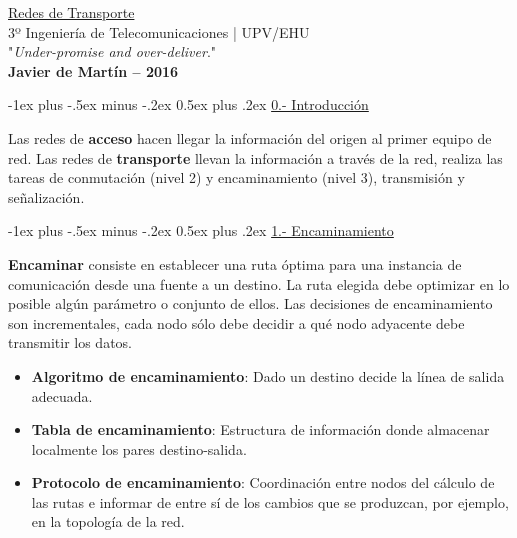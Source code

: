\documentclass[10pt,portrait, twocolumn]{article}
\makeatletter
\renewcommand{\section}{\@startsection{section}{1}{0mm}%
                                {-1ex plus -.5ex minus -.2ex}%
                                {0.5ex plus .2ex}%
                                {\normalfont\large\bfseries}}
\makeatother
\begin{document}
\begin{framed}
	\begin{center}
    	\Large{\underline{Redes de Transporte}} \\
    	\scriptsize{3º Ingeniería de Telecomunicaciones | UPV/EHU}\\
     	"\textsl{Under-promise and over-deliver}." \\
     	\small{\textbf{Javier de Martín -- 2016}}
	\end{center}
\end{framed}


\section{\underline{0.- Introducción}}

Las redes de \textbf{acceso} hacen llegar la información del origen al primer equipo de red. Las redes de \textbf{transporte} llevan la información a través de la red, realiza las tareas de conmutación (nivel 2) y encaminamiento (nivel 3), transmisión y señalización.

\hrulefill

\section{\underline{1.- Encaminamiento}}

\textbf{Encaminar} consiste en establecer una ruta óptima para una instancia de comunicación desde una fuente a un destino. La ruta elegida debe optimizar en lo posible algún parámetro o conjunto de ellos. Las decisiones de encaminamiento son incrementales, cada nodo sólo debe decidir a qué nodo adyacente debe transmitir los datos.

\begin{itemize}
	\item \textbf{Algoritmo de encaminamiento}: Dado un destino decide la línea de salida adecuada.
	\item \textbf{Tabla de encaminamiento}: Estructura de información donde almacenar localmente los pares destino-salida.
	\item \textbf{Protocolo de encaminamiento}: Coordinación entre nodos del cálculo de las rutas e informar de entre sí de los cambios que se produzcan, por ejemplo, en la topología de la red.
\end{itemize}
\end{document}
